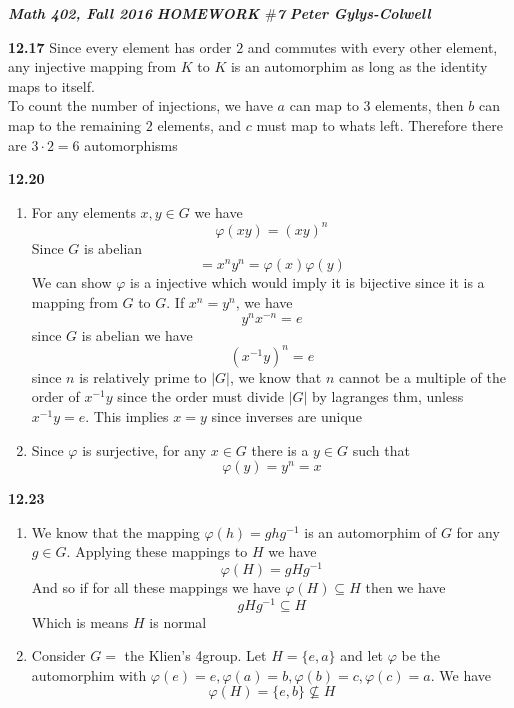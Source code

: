 \documentclass[12pt]{article}
\newenvironment{ques}{\vspace{2 ex}}{\vspace{2 ex}}
\theoremstyle{definition}
\begin{document}
\noindent \textit{\textbf{Math 402, Fall 2016}} \hspace{1.3cm}
\textit{\textbf{HOMEWORK $\#$7}} \hspace{1.3cm} \textit{\textbf{Peter
Gylys-Colwell}} 

\vspace{1cm}

\begin{ques}
	\textbf{12.17}
		Since every element has order $2$ and commutes with every other
		element, any injective mapping from $K$ to $K$ is an
		automorphim as long as the identity maps to itself.\\
		To count the number of injections, we have $a$ can map to $3$
		elements, then $b$ can map to the remaining $2$ elements, and
		$c$ must map to whats left. Therefore there are $3\cdot 2 = 6$ automorphisms
\end{ques}

\begin{ques}
	\textbf{12.20}
		\begin{enumerate}
			\item
				For any elements $x,y \in G$ we have
				$$\varphi (xy) = (xy)^n$$
				Since $G$ is abelian
				$$= x^ny^n = \varphi(x)\varphi(y)$$
				We can show $\varphi$ is a injective which
				would imply it is bijective since it is a
				mapping from $G$ to $G$. If $x^n = y^n$,
				we have 
				$$y^nx^{-n} = e$$
				since $G$ is abelian we have
				$$(x^{-1}y)^n = e$$
				since $n$ is relatively prime to $|G|$, we know
				that $n$ cannot be a multiple of the order of
				$x^{-1}y$ since the order must divide $|G|$ by
				lagranges thm, unless $x^{-1}y = e$. This
				implies $x = y$ since inverses are unique
			\item
				Since  $\varphi$ is surjective, for any $x \in
				G$ there is a $y \in G$ such that 
				$$\varphi(y) = y^n = x$$
		\end{enumerate}
\end{ques}

\begin{ques}
	\textbf{12.23}
		\begin{enumerate}
			\item
				We know that the mapping $\varphi(h) = ghg^{-1}$ is an
				automorphim of $G$ for any $g \in G$. Applying these
				mappings to $H$ we have
				$$\varphi(H) = gHg^{-1}$$
				And so if for all these mappings we have
				$\varphi(H) \subseteq H$ then we have
				$$gHg^{-1} \subseteq H$$
				Which is means $H$ is normal
			\item
				Consider $G =$ the Klien's 4group. Let $H =
				\{e, a\}$ and let $\varphi$ be the automorphim
				with  $\varphi(e) = e, \varphi(a) = b, \varphi(b) = c,
				\varphi(c) = a$. We have
				$$\varphi(H) = \{e, b\} \not \subseteq H$$
		\end{enumerate}
\end{ques}
\end{document}
